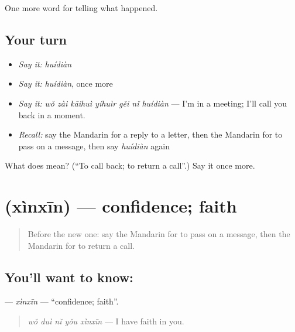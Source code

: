 \begin{grammarlens}[title={What you've built}]
One more word for telling what happened.
\end{grammarlens}

\subsection*{Your turn}
\begin{itemize}
\raggedright
  \item \emph{Say it:} \emph{huídiàn}
  \item \emph{Say it:} \emph{huídiàn}, once more
  \item \emph{Say it:} \emph{wǒ zài kāihuì yíhuìr gěi nǐ huídiàn} — I'm in a meeting; I'll call you back in a moment.
  \item \emph{Recall:} say the Mandarin for a reply to a letter, then the Mandarin for to pass on a message, then say \emph{huídiàn} again
\end{itemize}

\begin{tcolorbox}[breakable,colback=teal!4,colframe=teal!35!black,title={Before you move on}]
What does  mean? (\textquotedblleft{}To call back; to return a call\textquotedblright{}.) Say it once more.
\end{tcolorbox}
\section[\texorpdfstring{\zh{信心} (xìnxīn)}{信心 (xìnxīn)}]{ (xìnxīn) — confidence; faith}

\label{lesson:ZH-C319-xinxin}



\begin{quote}
Before the new one: say the Mandarin for to pass on a message, then the Mandarin for to return a call.
\end{quote}

\subsection*{You'll want to know: }
\textbf{} — \emph{xìnxīn} — \textquotedblleft{}confidence; faith\textquotedblright{}.

\begin{quote}
\textbf{} \emph{wǒ duì nǐ yǒu xìnxīn} — I have faith in you.
\end{quote}

